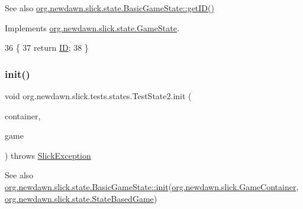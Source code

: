 \begin{DoxySeeAlso}{See also}
\mbox{\hyperlink{classorg_1_1newdawn_1_1slick_1_1state_1_1_basic_game_state_a781ce2b3d6dd9b9853adb011f5e75cf7}{org.\+newdawn.\+slick.\+state.\+Basic\+Game\+State\+::get\+I\+D()}} 
\end{DoxySeeAlso}


Implements \mbox{\hyperlink{interfaceorg_1_1newdawn_1_1slick_1_1state_1_1_game_state_a54f2bc6a91feaf0614a5ef19f1d03313}{org.\+newdawn.\+slick.\+state.\+Game\+State}}.


\begin{DoxyCode}
36                        \{
37         \textcolor{keywordflow}{return} \mbox{\hyperlink{classorg_1_1newdawn_1_1slick_1_1tests_1_1states_1_1_test_state2_af4acaeb03d81e63e05f853dbb1ef1190}{ID}};
38     \}
\end{DoxyCode}
\mbox{\label{classorg_1_1newdawn_1_1slick_1_1tests_1_1states_1_1_test_state2_a90fa7ac501b43d077653fbb8e158fe82}} 
\subsubsection{\texorpdfstring{init()}{init()}}
{\footnotesize\ttfamily void org.\+newdawn.\+slick.\+tests.\+states.\+Test\+State2.\+init (\begin{DoxyParamCaption}\item[{\mbox{\hyperlink{classorg_1_1newdawn_1_1slick_1_1_game_container}{Game\+Container}}}]{container,  }\item[{\mbox{\hyperlink{classorg_1_1newdawn_1_1slick_1_1state_1_1_state_based_game}{State\+Based\+Game}}}]{game }\end{DoxyParamCaption}) throws \mbox{\hyperlink{classorg_1_1newdawn_1_1slick_1_1_slick_exception}{Slick\+Exception}}\hspace{0.3cm}{\ttfamily [inline]}}

\begin{DoxySeeAlso}{See also}
\mbox{\hyperlink{interfaceorg_1_1newdawn_1_1slick_1_1state_1_1_game_state_aa799a369e0fcfe6822d2d586fa6f5bbc}{org.\+newdawn.\+slick.\+state.\+Basic\+Game\+State\+::init}}(\mbox{\hyperlink{classorg_1_1newdawn_1_1slick_1_1_game_container}{org.\+newdawn.\+slick.\+Game\+Container}}, \mbox{\hyperlink{classorg_1_1newdawn_1_1slick_1_1state_1_1_state_based_game}{org.\+newdawn.\+slick.\+state.\+State\+Based\+Game}}) 
\end{DoxySeeAlso}


